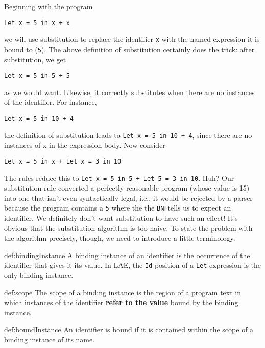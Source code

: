 \documentclass{book}
\newcommand{\bnf}{\texttt{BNF}}
\newcommand{\lae}{\textsc{LAE}\xspace}
\begin{document}
Beginning with the program

\texttt{Let x = 5 in x + x}

\noindent 
we will use substitution to replace the identifier 
\texttt{x} with the named expression it is bound 
to (\texttt{5}). The above definition of substitution 
certainly does the trick: after substitution, we 
get 

\texttt{Let x = 5 in 5 + 5} 

\noindent

as we would want. Likewise, it correctly substitutes 
when there are no instances of the identifier. For instance, 

\texttt{Let x = 5 in 10 + 4} 

\noindent the definition of substitution leads 
to \texttt{Let x = 5 in 10 + 4}, since there are 
no instances of x in the expression body. Now consider 

\texttt{Let x = 5 in x + Let x = 3 in 10}

\noindent 

The rules reduce this to \texttt{Let x = 5 in 5 + Let 5 = 3 in 10}. 
Huh? Our substitution rule converted a perfectly reasonable program 
(whose value is 15) into one that 
isn't even syntactically legal, i.e., it would be rejected by a parser 
because the program contains a \texttt{5} where the 
the \bnf tells us to expect an identifier. We definitely don't 
want substitution to have such an effect! It's 
obvious that the substitution algorithm is too naive. To state 
the problem with the algorithm precisely, though, we 
need to introduce a little terminology. 


\begin{mydef}{def:bindingInstance}
A binding instance of an identifier is the 
occurrence of the identifier that gives it its 
value. In \lae, the \texttt{Id} position of a 
\texttt{Let} expression is the only binding instance. 
\end{mydef}

\begin{mydef}[Scope]{def:scope}
The scope of a binding instance is the region 
of a program text in which instances of 
the identifier {\bf refer to the value} bound 
by the binding instance. 
\end{mydef}

\begin{mydef}{def:boundInstance}
An identifier is bound if it is contained within the 
scope of a binding instance of its name. 
\end{mydef}
\end{document}
